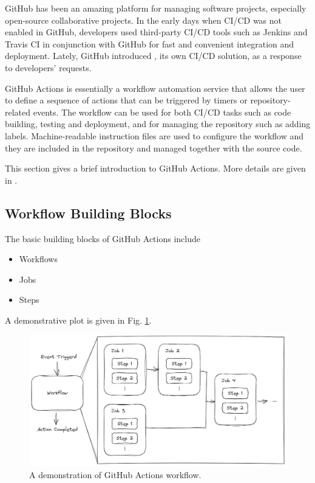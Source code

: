 GitHub has been an amazing platform for managing software projects, especially open-source collaborative projects. In the early days when CI/CD was not enabled in GitHub, developers used third-party CI/CD tools such as Jenkins and Travis CI in conjunction with GitHub for fast and convenient integration and deployment. Lately, GitHub introduced , its own CI/CD solution, as a response to developers' requests.

GitHub Actions is essentially a workflow automation service that allows the user to define a sequence of actions that can be triggered by timers or repository-related events. The workflow can be used for both CI/CD tasks such as code building, testing and deployment, and for managing the repository such as adding labels. Machine-readable instruction files are used to configure the workflow and they are included in the repository and managed together with the source code.

This section gives a brief introduction to GitHub Actions. More details are given in \cite{git2025reference}.

\subsection{Workflow Building Blocks}

The basic building blocks of GitHub Actions include
\begin{itemize}
  \item Workflows
  \item Jobs
  \item Steps
\end{itemize}
A demonstrative plot is given in Fig. \ref{fig:actions_workflow}.
\begin{figure}[!htb]
	\centering
	\includegraphics[width=350pt]{chapters/ap/figures/action_framework.png}
	\caption{A demonstration of GitHub Actions workflow.} \label{fig:actions_workflow}
\end{figure}

